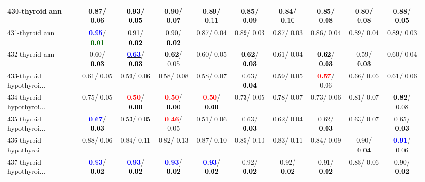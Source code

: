 \begin{table}[h]
\begin{center}
{\begin{tabular}{lc|c|c|c|c|c|c|c|c}
430-thyroid ann &   0.87/  0.06 & \textcolor{black}{\textbf{  0.93}}/\textcolor{black}{\textbf{  0.05}} &   0.90/  0.07 &   0.89/  0.11 &   0.85/  0.09 &   0.84/  0.10 &   0.85/  0.08 &   0.80/  0.08 &   0.88/\textcolor{black}{\textbf{  0.05}} \\ \hline
431-thyroid ann & \textcolor{blue}{\textbf{  0.95}}/\textcolor{darkgreen}{\textbf{  0.01}} &   0.91/\textcolor{black}{\textbf{  0.02}} &   0.90/\textcolor{black}{\textbf{  0.02}} &   0.87/  0.04 &   0.89/  0.03 &   0.87/  0.03 &   0.86/  0.04 &   0.89/  0.04 &   0.89/  0.03 \\
432-thyroid ann &   0.60/\textcolor{black}{\textbf{  0.03}} & \underline{\textcolor{blue}{\textbf{  0.63}}}/\textcolor{black}{\textbf{  0.03}} & \textcolor{black}{\textbf{  0.62}}/  0.05 &   0.60/  0.05 & \textcolor{black}{\textbf{  0.62}}/\textcolor{black}{\textbf{  0.03}} &   0.61/  0.04 & \textcolor{black}{\textbf{  0.62}}/\textcolor{black}{\textbf{  0.03}} &   0.59/\textcolor{black}{\textbf{  0.03}} &   0.60/  0.04 \\
433-thyroid hypothyroi... &   0.61/  0.05 &   0.59/  0.06 &   0.58/  0.08 &   0.58/  0.07 &   0.63/\textcolor{black}{\textbf{  0.04}} &   0.59/  0.05 & \textcolor{red}{\textbf{  0.57}}/  0.06 &   0.66/  0.06 &   0.61/  0.06 \\
434-thyroid hypothyroi... &   0.75/  0.05 & \textcolor{red}{\textbf{  0.50}}/\textcolor{black}{\textbf{  0.00}} & \textcolor{red}{\textbf{  0.50}}/\textcolor{black}{\textbf{  0.00}} & \textcolor{red}{\textbf{  0.50}}/\textcolor{black}{\textbf{  0.00}} &   0.73/  0.05 &   0.78/  0.07 &   0.73/  0.06 &   0.81/  0.07 & \textcolor{black}{\textbf{  0.82}}/  0.08 \\
435-thyroid hypothyroi... & \textcolor{blue}{\textbf{  0.67}}/\textcolor{black}{\textbf{  0.03}} &   0.53/  0.05 & \textcolor{red}{\textbf{  0.46}}/  0.05 &   0.51/  0.06 &   0.63/\textcolor{black}{\textbf{  0.03}} &   0.62/  0.04 &   0.62/\textcolor{black}{\textbf{  0.03}} &   0.63/  0.07 &   0.65/\textcolor{black}{\textbf{  0.03}} \\
436-thyroid hypothyroi... &   0.88/  0.06 &   0.84/  0.11 &   0.82/  0.13 &   0.87/  0.10 &   0.85/  0.10 &   0.83/  0.11 &   0.84/  0.09 &   0.90/\textcolor{black}{\textbf{  0.04}} & \textcolor{blue}{\textbf{  0.91}}/  0.06 \\
437-thyroid hypothyroi... & \textcolor{blue}{\textbf{  0.93}}/\textcolor{black}{\textbf{  0.02}} & \textcolor{blue}{\textbf{  0.93}}/\textcolor{black}{\textbf{  0.02}} & \textcolor{blue}{\textbf{  0.93}}/\textcolor{black}{\textbf{  0.02}} & \textcolor{blue}{\textbf{  0.93}}/\textcolor{black}{\textbf{  0.02}} &   0.92/\textcolor{black}{\textbf{  0.02}} &   0.92/\textcolor{black}{\textbf{  0.02}} &   0.91/\textcolor{black}{\textbf{  0.02}} &   0.88/  0.06 &   0.90/\textcolor{black}{\textbf{  0.02}} \\ \hline

\end{tabular}}
\end{center}
\end{table}
